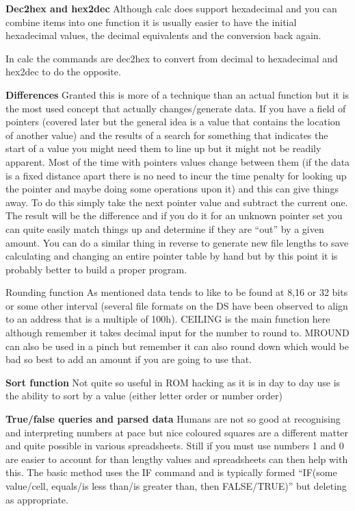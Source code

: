 \documentclass[
]{book}
\begin{document}
\textbf{Dec2hex and hex2dec} Although calc does support hexadecimal and you can combine items into one function it is usually easier to have the initial hexadecimal values, the decimal equivalents and the conversion back again.

In calc the commands are dec2hex to convert from decimal to hexadecimal and hex2dec to do the opposite.

\textbf{Differences} Granted this is more of a technique than an actual function but it is the most used concept that actually changes/generate data. If you have a field of pointers (covered later but the general idea is a value that contains the location of another value) and the results of a search for something that indicates the start of a value you might need them to line up but it might not be readily apparent. Most of the time with pointers values change between them (if the data is a fixed distance apart there is no need to incur the time penalty for looking up the pointer and maybe doing some operations upon it) and this can give things away. To do this simply take the next pointer value and subtract the current one. The result will be the difference and if you do it for an unknown pointer set you can quite easily match things up and determine if they are ``out'' by a given amount. You can do a similar thing in reverse to generate new file lengths to save calculating and changing an entire pointer table by hand but by this point it is probably better to build a proper program.

Rounding function As mentioned data tends to like to be found at 8,16 or 32 bits or some other interval (several file formats on the DS have been observed to align to an address that is a multiple of 100h). CEILING is the main function here although remember it takes decimal input for the number to round to. MROUND can also be used in a pinch but remember it can also round down which would be bad so best to add an amount if you are going to use that.

\textbf{Sort function} Not quite so useful in ROM hacking as it is in day to day use is the ability to sort by a value (either letter order or number order)

\textbf{True/false queries and parsed data} Humans are not so good at recognising and interpreting numbers at pace but nice coloured squares are a different matter and quite possible in various spreadsheets. Still if you must use numbers 1 and 0 are easier to account for than lengthy values and spreadsheets can then help with this. The basic method uses the IF command and is typically formed ``IF(some value/cell, equals/is less than/is greater than, then FALSE/TRUE)'' but deleting as appropriate.
\end{document}
